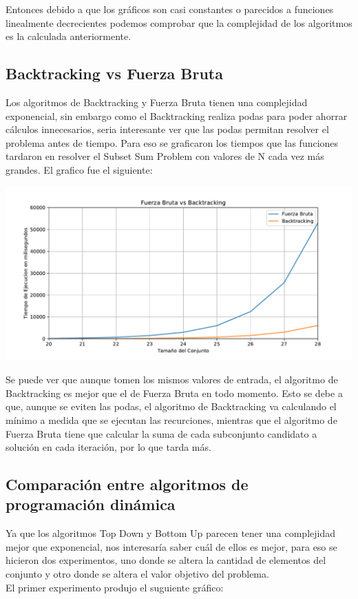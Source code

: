 \documentclass[a4paper]{article}
\begin{document}
Entonces debido a que los gráficos son casi constantes o parecidos a funciones linealmente decrecientes podemos comprobar que la complejidad de los algoritmos es la calculada anteriormente.

\subsection{Backtracking vs Fuerza Bruta}
Los algoritmos de Backtracking y Fuerza Bruta tienen una complejidad exponencial, sin embargo como el Backtracking realiza podas para poder ahorrar cálculos innecesarios, seria interesante ver que las podas permitan resolver el problema antes de tiempo. Para eso se graficaron los tiempos que las funciones tardaron en resolver el Subset Sum Problem con valores de N cada vez más grandes.
El grafico fue el siguiente:

\begin{center}
	\includegraphics[width=.8\linewidth]{G11v2.pdf}
\end{center}

Se puede ver que aunque tomen los mismos valores de entrada, el algoritmo de Backtracking es mejor que el de Fuerza Bruta en todo momento. Esto se debe a que, aunque se eviten las podas, el algoritmo de Backtracking va calculando el mínimo a medida que se ejecutan las recurciones, mientras que el algoritmo de Fuerza Bruta tiene que calcular la suma de cada subconjunto candidato a solución en cada iteración, por lo que tarda más.

\subsection{Comparación entre algoritmos de programación dinámica}

Ya que los algoritmos Top Down y Bottom Up parecen tener una complejidad mejor que exponencial, nos interesaría saber cuál de ellos es mejor, para eso se hicieron dos experimentos, uno donde se altera la cantidad de elementos del conjunto y otro donde se altera el valor objetivo del problema.
\\
El primer experimento produjo el suguiente gráfico:
\end{document}
